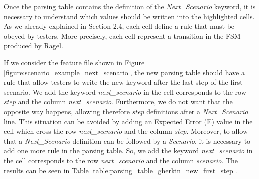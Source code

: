 \noindent Once the parsing table contains the definition of the \textit{Next\_Scenario} keyword, it is necessary to understand which values should be written into the highlighted cells. As we already explained in Section 2.4, each cell define a rule that must be obeyed by testers. More precisely, each cell represent a transition in the FSM produced by Ragel.

If we consider the feature file shown in Figure \ref{figure:scenario_example_next_scenario}, the new parsing table should have a rule that allow testers to write the new keyword after the last step of the first scenario. We add the keyword \textit{next\_scenario} in the cell corresponds to the row \textit{step} and the column \textit{next\_scenario}. Furthermore, we do not want that the opposite way happens, allowing therefore \textit{step} definitions after a \textit{Next\_Scenario} line. This situation can be avoided by adding an Expected Error (E) value in the cell which cross the row \textit{next\_scenario} and the column \textit{step}. Moreover, to allow that a \textit{Next\_Scenario} definition can be followed by a \textit{Scenario}, it is necessary to add one more rule in the parsing table. So, we add the keyword \textit{next\_scenario} in the cell corresponds to the row \textit{next\_scenario} and the column \textit{scenario}. The results can be seen in Table \ref{table:parsing_table_gherkin_new_first_step}.

